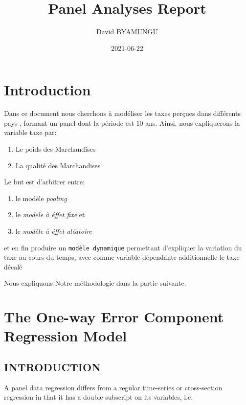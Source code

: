 \documentclass[
]{book}
\title{Panel Analyses Report}
\author{David BYAMUNGU}
\date{2021-06-22}
\providecommand{\tightlist}{%
  \setlength{\itemsep}{0pt}\setlength{\parskip}{0pt}}
\begin{document}
\maketitle

{
\setcounter{tocdepth}{1}
\tableofcontents
}
\hypertarget{intro}{%
\chapter{Introduction}\label{intro}}

Dans ce document nous cherchons à modéliser les taxes perçues dans différents pays , formant un panel dont la période est 10 ans.
Ainsi, nous expliquerons la variable taxe par:

\begin{enumerate}
\def\labelenumi{(\arabic{enumi})}
\tightlist
\item
  Le poids des Marchandises
\item
  La qualité des Marchandises
\end{enumerate}

Le but est d'arbitrer entre:

\begin{enumerate}
\def\labelenumi{(\arabic{enumi})}
\tightlist
\item
  le modèle \emph{pooling}
\item
  le \emph{modele à éffet fixe} et
\item
  le \emph{modèle à éffet aléatoire}
\end{enumerate}

et en fin produire un \texttt{modèle\ dynamique} permettant d'expliquer la variation du taxe au cours du temps, avec comme variable dépendante additionnelle le taxe décalé

Nous expliquons Notre méthodologie dans la partie suivante.

\hypertarget{the-one-way-error-component-regression-model}{%
\chapter{The One-way Error Component Regression Model}\label{the-one-way-error-component-regression-model}}

\hypertarget{introduction}{%
\section{INTRODUCTION}\label{introduction}}

A panel data regression differs from a regular time-series or cross-section regression in that it has a double subscript on its variables, i.e.
\end{document}
